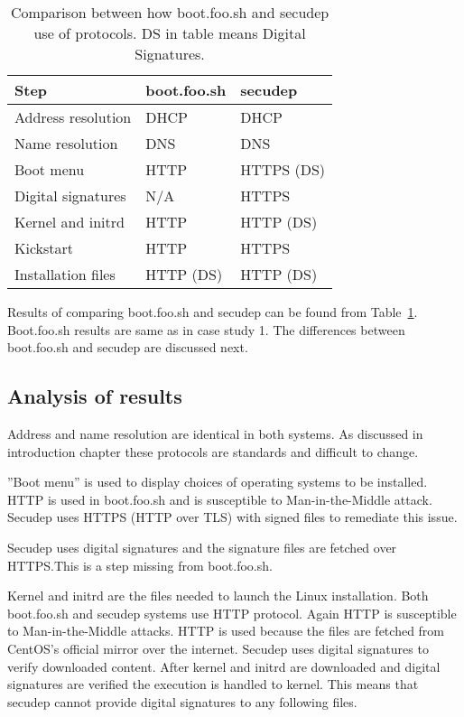 \begin{table}[!ht]
  \def\arraystretch{1.1}%
  \begin{center}
    \caption{Comparison between how boot.foo.sh and secudep use of
      protocols. DS in table means Digital
      Signatures.\label{tab:comparison_table}}
    \begin{tabular}{| l | l | l |}
      \hline
      Step               & boot.foo.sh   & secudep    \\
      \hline
      Address resolution & DHCP          & DHCP       \\
      Name resolution    & DNS           & DNS        \\
      Boot menu          & HTTP          & HTTPS (DS) \\
      Digital signatures & N/A           & HTTPS      \\
      Kernel and initrd  & HTTP          & HTTP (DS)  \\
      Kickstart          & HTTP          & HTTPS      \\
      Installation files & HTTP (DS)     & HTTP (DS)  \\
      \hline
    \end{tabular}
  \end{center}
\end{table}

Results of comparing boot.foo.sh and secudep can be found from
Table~\ref{tab:comparison_table}. Boot.foo.sh results are same as in
case study 1. The differences between boot.foo.sh and secudep are
discussed next.


\subsection{Analysis of results}

Address and name resolution are identical in both systems. As
discussed in introduction chapter these protocols are standards and
difficult to change.

''Boot menu'' is used to display choices of operating systems to be
installed. HTTP is used in boot.foo.sh and is susceptible to
Man-in-the-Middle attack. Secudep uses HTTPS (HTTP over TLS) with
signed files to remediate this issue.

Secudep uses digital signatures and the signature files are fetched
over HTTPS.\@ This is a step missing from boot.foo.sh.

Kernel and initrd are the files needed to launch the Linux
installation. Both boot.foo.sh and secudep systems use HTTP
protocol. Again HTTP is susceptible to Man-in-the-Middle attacks. HTTP
is used because the files are fetched from CentOS's official mirror
over the internet. Secudep uses digital signatures to verify
downloaded content. After kernel and initrd are downloaded and digital
signatures are verified the execution is handled to kernel. This means
that secudep cannot provide digital signatures to any following files.


